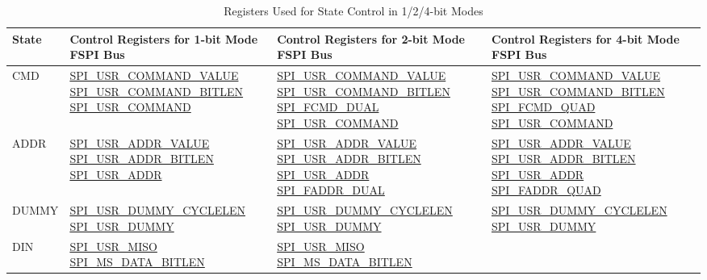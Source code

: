 \documentclass[main\_\_EN.tex]{subfiles}
\begin{document}
\begin{longtable}[c]{ |L{1.3cm}|L{4.8cm}|L{4.8cm}|L{4.8cm}| }
\caption{Registers Used for State Control in 1/2/4-bit Modes}
\\\hline
{}
\textbf{State} & \textbf{Control Registers for 1-bit Mode FSPI Bus} & \textbf{Control Registers for 2-bit Mode FSPI Bus} & \textbf{Control Registers for 4-bit Mode FSPI Bus} \\
     \hline
\endhead
\label{tab:spi-usr1}
CMD  &\hyperref[fielddesc:SPIUSRCOMMANDVALUE]{SPI\_USR\_COMMAND\_VALUE}
      \hyperref[fielddesc:SPIUSRCOMMANDBITLEN]{SPI\_USR\_COMMAND\_BITLEN} \hyperref[fielddesc:SPIUSRCOMMAND]{SPI\_USR\_COMMAND}
     &\hyperref[fielddesc:SPIUSRCOMMANDVALUE]{SPI\_USR\_COMMAND\_VALUE} \hyperref[fielddesc:SPIUSRCOMMANDBITLEN]{SPI\_USR\_COMMAND\_BITLEN} \hyperref[fielddesc:SPIFCMDDUAL]{SPI\_FCMD\_DUAL}     \hyperref[fielddesc:SPIUSRCOMMAND]{SPI\_USR\_COMMAND} & \hyperref[fielddesc:SPIUSRCOMMANDVALUE]{SPI\_USR\_COMMAND\_VALUE}  \hyperref[fielddesc:SPIUSRCOMMANDBITLEN]{SPI\_USR\_COMMAND\_BITLEN}   \hyperref[fielddesc:SPIFCMDQUAD]{SPI\_FCMD\_QUAD}    \hyperref[fielddesc:SPIUSRCOMMAND]{SPI\_USR\_COMMAND} \\
     \hline
ADDR &\hyperref[fielddesc:SPIUSRADDRVALUE]{SPI\_USR\_ADDR\_VALUE}
      \hyperref[fielddesc:SPIUSRADDRBITLEN]{SPI\_USR\_ADDR\_BITLEN}    \hyperref[fielddesc:SPIUSRADDR]{SPI\_USR\_ADDR}
     &\hyperref[fielddesc:SPIUSRADDRVALUE]{SPI\_USR\_ADDR\_VALUE}   \hyperref[fielddesc:SPIUSRADDRBITLEN]{SPI\_USR\_ADDR\_BITLEN}    \hyperref[fielddesc:SPIUSRADDR]{SPI\_USR\_ADDR}      \hyperref[fielddesc:SPIFADDRDUAL]{SPI\_FADDR\_DUAL} &
     \hyperref[fielddesc:SPIUSRADDRVALUE]{SPI\_USR\_ADDR\_VALUE}   \hyperref[fielddesc:SPIUSRADDRBITLEN]{SPI\_USR\_ADDR\_BITLEN}    \hyperref[fielddesc:SPIUSRADDR]{SPI\_USR\_ADDR}                \hyperref[fielddesc:SPIFADDRQUAD]{SPI\_FADDR\_QUAD} \\
     \hline
DUMMY&\hyperref[fielddesc:SPIUSRDUMMYCYCLELEN]{SPI\_USR\_DUMMY\_CYCLELEN}
      \hyperref[fielddesc:SPIUSRDUMMY]{SPI\_USR\_DUMMY}
     &\hyperref[fielddesc:SPIUSRDUMMYCYCLELEN]{SPI\_USR\_DUMMY\_CYCLELEN}     \hyperref[fielddesc:SPIUSRDUMMY]{SPI\_USR\_DUMMY} &
     \hyperref[fielddesc:SPIUSRDUMMYCYCLELEN]{SPI\_USR\_DUMMY\_CYCLELEN}     \hyperref[fielddesc:SPIUSRDUMMY]{SPI\_USR\_DUMMY}\\
     \hline
DIN  &\hyperref[fielddesc:SPIUSRMISO]{SPI\_USR\_MISO}
      \hyperref[fielddesc:SPIMSDATABITLEN]{SPI\_MS\_DATA\_BITLEN}
     &\hyperref[fielddesc:SPIUSRMISO]{SPI\_USR\_MISO}
     \hyperref[fielddesc:SPIMSDATABITLEN]{SPI\_MS\_DATA\_BITLEN}

\end{longtable}
\end{document}
